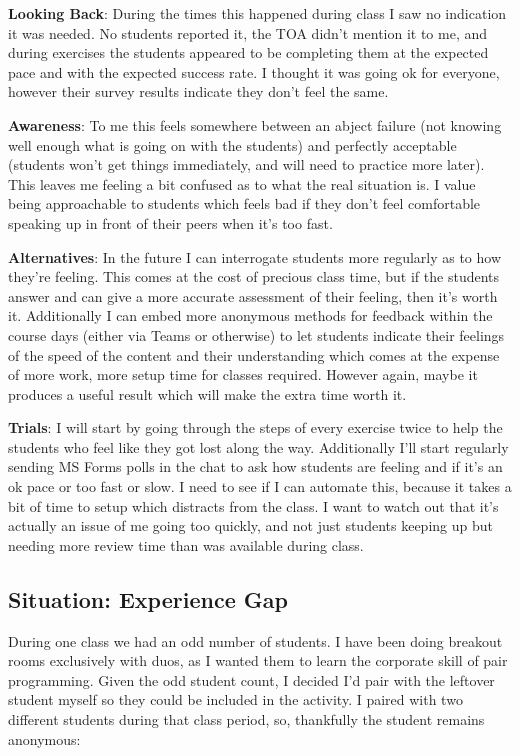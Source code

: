 \documentclass[paper=a4,justified,a4paper]{tufte-handout}
\begin{document}
\textbf{Looking Back}: During the times this happened during class I saw
no indication it was needed. No students reported it, the TOA didn't
mention it to me, and during exercises the students appeared to be
completing them at the expected pace and with the expected success rate.
I thought it was going ok for everyone, however their survey results
indicate they don't feel the same.

\textbf{Awareness}: To me this feels somewhere between an abject failure
(not knowing well enough what is going on with the students) and
perfectly acceptable (students won't get things immediately, and will
need to practice more later). This leaves me feeling a bit confused as
to what the real situation is. I value being approachable to students
which feels bad if they don't feel comfortable speaking up in front of
their peers when it's too fast.

\textbf{Alternatives}: In the future I can interrogate students more
regularly as to how they're feeling. This comes at the cost of precious
class time, but if the students answer and can give a more accurate
assessment of their feeling, then it's worth it. Additionally I can
embed more anonymous methods for feedback within the course days (either
via Teams or otherwise) to let students indicate their feelings of the
speed of the content and their understanding which comes at the expense
of more work, more setup time for classes required. However again, maybe
it produces a useful result which will make the extra time worth it.

\textbf{Trials}: I will start by going through the steps of every
exercise twice to help the students who feel like they got lost along
the way. Additionally I'll start regularly sending MS Forms polls in the
chat to ask how students are feeling and if it's an ok pace or too fast
or slow. I need to see if I can automate this, because it takes a bit of
time to setup which distracts from the class. I want to watch out that
it's actually an issue of me going too quickly, and not just students
keeping up but needing more review time than was available during class.

\hypertarget{situation-experience-gap}{%
\subsection{Situation: Experience Gap}\label{situation-experience-gap}}

During one class we had an odd number of students. I have been doing
breakout rooms exclusively with duos, as I wanted them to learn the
corporate skill of pair programming. Given the odd student count, I
decided I'd pair with the leftover student myself so they could be
included in the activity. I paired with two different students during
that class period, so, thankfully the student remains anonymous:
\end{document}
